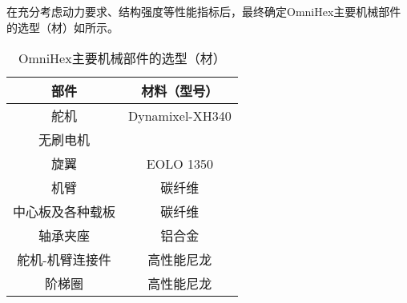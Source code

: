 在充分考虑动力要求、结构强度等性能指标后，最终确定OmniHex主要机械部件的选型（材）如所示。
\begin{table}[htbp]
    \caption{OmniHex主要机械部件的选型（材）\label{tab:mech_parts}}
    \vspace{0.5em}\centering\wuhao
    \begin{tabular}{cc}
    \toprule[1.5pt]
    部件 & 材料（型号）\\
    \midrule[1pt]
    舵机 & Dynamixel-XH340 \\
    无刷电机 & \ \\
    旋翼 & EOLO 1350 \\
    机臂 & 碳纤维 \\
    中心板及各种载板 & 碳纤维 \\
    轴承夹座 & 铝合金 \\
    舵机-机臂连接件 & 高性能尼龙 \\
    阶梯圈 & 高性能尼龙\\
    \bottomrule[1.5pt]
    \end{tabular}
\end{table}


